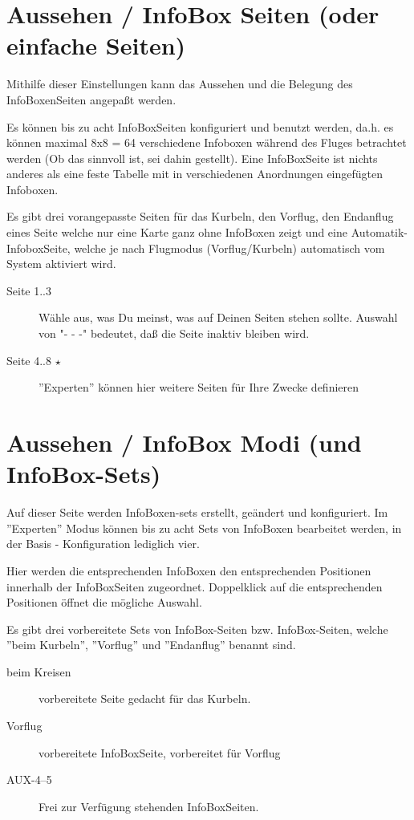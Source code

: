 \section{Aussehen / InfoBox Seiten (oder einfache Seiten)}

Mithilfe dieser Einstellungen kann das Aussehen und die Belegung des InfoBoxenSeiten angepaßt werden.

Es können bis zu acht InfoBoxSeiten konfiguriert und benutzt werden, da.h. es können maximal
8x8 = 64 verschiedene Infoboxen während des Fluges betrachtet werden (Ob das sinnvoll ist, sei dahin gestellt).
Eine InfoBoxSeite ist nichts anderes als eine feste Tabelle mit in verschiedenen Anordnungen eingefügten Infoboxen.

Es gibt drei vorangepasste Seiten für das Kurbeln, den Vorflug, den Endanflug eines Seite welche
nur eine Karte ganz ohne InfoBoxen zeigt und eine Automatik- InfoboxSeite, welche je nach Flugmodus
(Vorflug/Kurbeln) automatisch vom System aktiviert wird.

\begin{description}
\item[Seite  1..3] Wähle aus, was Du meinst, was auf Deinen Seiten stehen sollte.
       Auswahl von  "- - -" bedeutet, daß die Seite inaktiv bleiben wird.
\item[Seite 4..8 $\star$]  ''Experten'' können hier weitere Seiten für Ihre Zwecke definieren
\end{description}




\section{Aussehen / InfoBox Modi (und InfoBox-Sets)}\label{sec:infobox_sets}

Auf dieser Seite werden InfoBoxen-sets erstellt, geändert und konfiguriert.
Im ''Experten'' Modus können bis zu acht Sets von InfoBoxen bearbeitet werden,
in der Basis - Konfiguration lediglich vier.

Hier werden die entsprechenden InfoBoxen den entsprechenden Positionen innerhalb
der InfoBoxSeiten zugeordnet. Doppelklick auf die entsprechenden Positionen öffnet die mögliche Auswahl.

Es gibt drei vorbereitete Sets von InfoBox-Seiten
bzw. InfoBox-Seiten, welche ''beim Kurbeln'', ''Vorflug'' und ''Endanflug'' benannt sind.

\begin{description}
\item[beim Kreisen]  vorbereitete Seite gedacht für das Kurbeln.\\
\item[Vorflug] vorbereitete InfoBoxSeite, vorbereitet für Vorflug\\
\item[AUX-4--5]Frei zur Verfügung stehenden InfoBoxSeiten.
\end{description}

